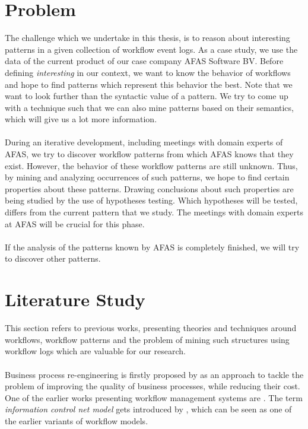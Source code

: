 \documentclass[a4paper,11pt]{article}
\begin{document}
\section{Problem}
The challenge which we undertake in this thesis, is to reason about interesting patterns in a given collection of workflow event logs. As a case study, we use the data of the current product of our case company AFAS Software BV. Before defining \textit{interesting} in our context, we want to know the behavior of workflows and hope to find patterns which represent this behavior the best. Note that we want to look further than the syntactic value of a pattern. We try to come up with a technique such that we can also mine patterns based on their semantics, which will give us a lot more information.\\
\\
During an iterative development, including meetings with domain experts of AFAS, we try to discover workflow patterns from which AFAS knows that they exist. However, the behavior of these workflow patterns are still unknown. Thus, by mining and analyzing occurrences of such patterns, we hope to find certain properties about these patterns. Drawing conclusions about such properties are being studied by the use of hypotheses testing. Which hypotheses will be tested, differs from the current pattern that we study. The meetings with domain experts at AFAS will be crucial for this phase.\\
\\
If the analysis of the patterns known by AFAS is completely finished, we will try to discover other patterns.


\section{Literature Study}
This section refers to previous works, presenting theories and techniques around workflows, workflow patterns and the problem of mining such structures using workflow logs which are valuable for our research.\\
\\
Business process re-engineering is firstly proposed by \cite{Hammer1990} as an approach to tackle the problem of improving the quality of business processes, while reducing their cost. One of the earlier works presenting workflow management systems are \cite{EngelGLT79,Ellis1982}. The term \textit{information control net model} gets introduced by \cite{Ellis1982}, which can be seen as one of the earlier variants of workflow models. 
\end{document}
